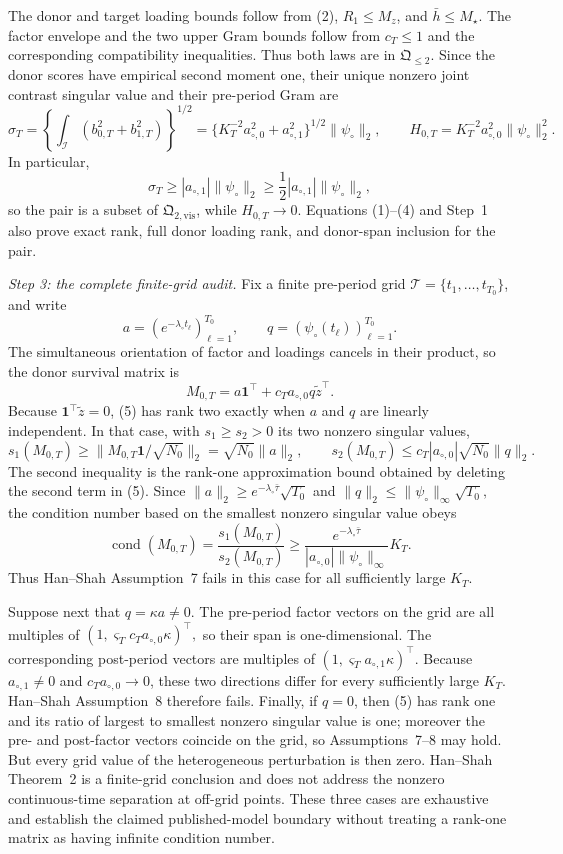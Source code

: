The donor and target loading bounds follow from (2), \(R_1\le M_z\), and \(\bar h\le M_\star\).  The factor envelope and the two upper Gram bounds follow from \(c_T\le1\) and the corresponding compatibility inequalities.  Thus both laws are in \(\mathfrak Q_{\le2}\).  Since the donor scores have empirical second moment one, their unique nonzero joint contrast singular value and their pre-period Gram are
\[
 \sigma_T
 =\left\{\int_{\mathcal I}(b_{0,T}^2+b_{1,T}^2)\right\}^{1/2}
 =\{K_T^{-2}a_{\circ,0}^2+a_{\circ,1}^2\}^{1/2}\|\psi_\circ\|_2,
 \qquad
 H_{0,T}=K_T^{-2}a_{\circ,0}^2\|\psi_\circ\|_2^2.     \tag{3}
\]
In particular,
\[
 \sigma_T\ge |a_{\circ,1}|\|\psi_\circ\|_2
 \ge\frac12|a_{\circ,1}|\|\psi_\circ\|_2,            \tag{4}
\]
so the pair is a subset of \(\mathfrak Q_{2,\mathrm{vis}}\), while \(H_{0,T}\to0\).  Equations (1)--(4) and Step~1 also prove exact rank, full donor loading rank, and donor-span inclusion for the pair.

\emph{Step 3: the complete finite-grid audit.}
Fix a finite pre-period grid \(\mathcal T=\{t_1,\ldots,t_{T_0}\}\), and write
\[
 a=(e^{-\lambda_\circ t_\ell})_{\ell=1}^{T_0},
 \qquad q=(\psi_\circ(t_\ell))_{\ell=1}^{T_0}.
\]
The simultaneous orientation of factor and loadings cancels in their product, so the donor survival matrix is
\[
 M_{0,T}=a\mathbf1^\top+c_Ta_{\circ,0}q\widetilde z^\top. \tag{5}
\]
Because \(\mathbf1^\top\widetilde z=0\), (5) has rank two exactly when \(a\) and \(q\) are linearly independent.  In that case, with \(s_1\ge s_2>0\) its two nonzero singular values,
\[
 s_1(M_{0,T})
 \ge\|M_{0,T}\mathbf1/\sqrt{N_0}\|_2
 =\sqrt{N_0}\|a\|_2,
 \qquad
 s_2(M_{0,T})
 \le c_T|a_{\circ,0}|\sqrt{N_0}\|q\|_2.              \tag{6}
\]
The second inequality is the rank-one approximation bound obtained by deleting the second term in (5).  Since
\(
 \|a\|_2\ge e^{-\lambda_\circ\bar\tau}\sqrt{T_0}
\)
and
\(
 \|q\|_2\le\|\psi_\circ\|_\infty\sqrt{T_0},
\)
the condition number based on the smallest nonzero singular value obeys
\[
 \operatorname{cond}(M_{0,T})
 =\frac{s_1(M_{0,T})}{s_2(M_{0,T})}
 \ge
 \frac{e^{-\lambda_\circ\bar\tau}}
 {|a_{\circ,0}|\|\psi_\circ\|_\infty}K_T.             \tag{7}
\]
Thus Han--Shah Assumption~7 fails in this case for all sufficiently large \(K_T\).

Suppose next that \(q=\kappa a\ne0\).  The pre-period factor vectors on the grid are all multiples of
\(
 (1,\varsigma_Tc_Ta_{\circ,0}\kappa)^\top,
\)
so their span is one-dimensional.  The corresponding post-period vectors are multiples of
\(
 (1,\varsigma_Ta_{\circ,1}\kappa)^\top.
\)
Because \(a_{\circ,1}\ne0\) and \(c_Ta_{\circ,0}\to0\), these two directions differ for every sufficiently large \(K_T\).  Han--Shah Assumption~8 therefore fails.  Finally, if \(q=0\), then (5) has rank one and its ratio of largest to smallest nonzero singular value is one; moreover the pre- and post-factor vectors coincide on the grid, so Assumptions~7--8 may hold.  But every grid value of the heterogeneous perturbation is then zero.  Han--Shah Theorem~2 is a finite-grid conclusion and does not address the nonzero continuous-time separation at off-grid points.  These three cases are exhaustive and establish the claimed published-model boundary without treating a rank-one matrix as having infinite condition number.


